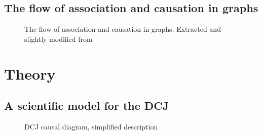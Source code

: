 \documentclass[
  authoryear,
  preprint,
  1p]{elsarticle}
\begin{document}
\subsection{The flow of association and causation in
graphs}\label{sec-framework-flow}

\begin{figure}


\caption{\label{fig-ACflow}The flow of association and causation in
graphs. Extracted and slightly modified from \citet[31]{Neal_2020}}

\end{figure}%

\section{Theory}\label{sec-theory}

\subsection{A scientific model for the DCJ}\label{sec-theory-scientific}

\begin{figure}


\caption{\label{fig-SciModel_simp1}DCJ causal diagram, simplified
description}

\end{figure}%
\end{document}
